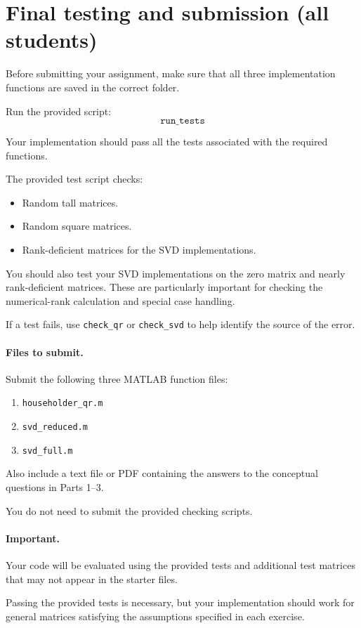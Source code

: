 \documentclass{ximera}
\begin{document}
\section*{Final testing and submission (all students)}

Before submitting your assignment, make sure that all three
implementation functions are saved in the correct folder.

Run the provided script:
\[
\texttt{run\_tests}
\]

Your implementation should pass all the tests associated with
the required functions.

The provided test script checks:

\begin{itemize}
    \item Random tall matrices.
    \item Random square matrices.
    \item Rank-deficient matrices for the SVD implementations.
\end{itemize}

You should also test your SVD implementations on the zero matrix
and nearly rank-deficient matrices. These are particularly
important for checking the numerical-rank calculation and
special case handling.

If a test fails, use \texttt{check\_qr} or \texttt{check\_svd} to help
identify the source of the error.

\paragraph{Files to submit.}

Submit the following three MATLAB function files:

\begin{enumerate}
    \item \texttt{householder\_qr.m}
    \item \texttt{svd\_reduced.m}
    \item \texttt{svd\_full.m}
\end{enumerate}

Also include a text file or PDF containing the answers to the
conceptual questions in Parts 1--3.

You do not need to submit the provided checking scripts.

\paragraph{Important.}

Your code will be evaluated using the provided tests and
additional test matrices that may not appear in the starter
files.

Passing the provided tests is necessary, but your implementation
should work for general matrices satisfying the assumptions
specified in each exercise.
\end{document}
